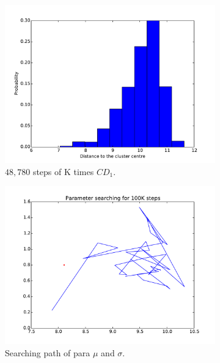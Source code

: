 \begin{figure}[hbt]
\begin{subfigure}[t]{0.18\textwidth}
			\includegraphics[width=\textwidth]{pics_sdbn/kcd_18428.pdf}
		    \caption{$ 48,780 $ steps of K times $CD_1$.}
		\end{subfigure}
		\begin{subfigure}[t]{0.18\textwidth}
			\includegraphics[width=\textwidth]{pics_sdbn/kcd_long_para.pdf}
		    \caption{Searching path of para $\mu$ and $\sigma$.}
		\end{subfigure}\\
		\begin{subfigure}[t]{0.18\textwidth}

\end{subfigure}
\end{figure}
